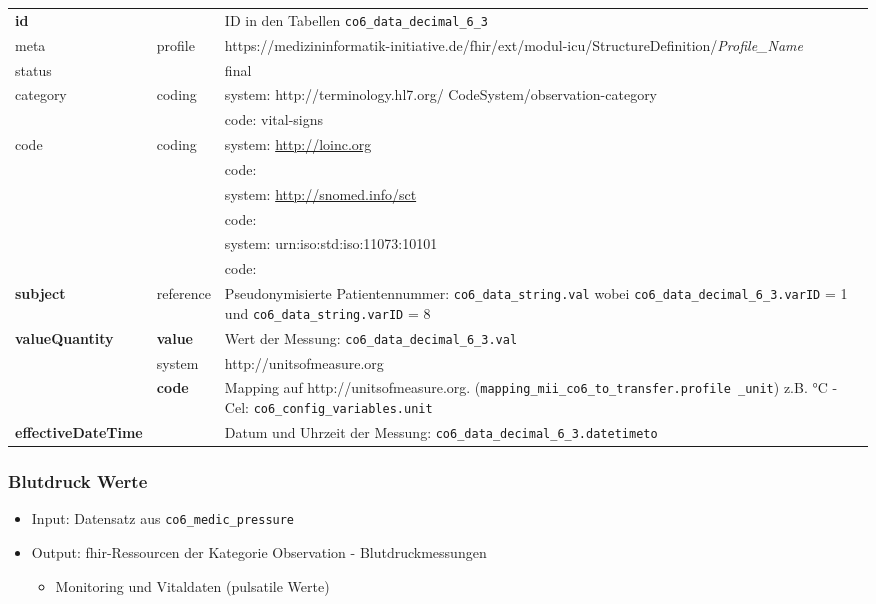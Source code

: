 \begin{longtable}{|l|l|p{7.5cm}|} 
	\hline
	\rowcolor{lightgray} \multicolumn{3}{|l|}{Data Mapping (inhaltlich) - nummerische Werte} \\ \hline
	\textbf{id} &  & ID in den Tabellen \texttt{co6\_data\_decimal\_6\_3} \\ \hline
	meta & profile & https://medizininformatik-initiative.de/fhir/ext/modul-icu/StructureDefinition/\textsl{Profile\_Name} \\ \hline 
	status &  & final  \\ \hline 
	category & coding & system: http://terminology.hl7.org/ CodeSystem/observation-category \\ 
	\cline{3-3}
	& & code: vital-signs \\ \hline
	code & coding & system: \url{http://loinc.org} \\ 
	\cline{3-3} 
	&  & code:  \\ 
	\cline{3-3} 
	&  & system: \url{http://snomed.info/sct} \\ 
	\cline{3-3}
	&  & code:  \\ 
	\cline{3-3} 
	&  & system: urn:iso:std:iso:11073:10101 \\ 
	\cline{3-3}
	&  & code:  \\ \hline
	\textbf{subject} & reference & Pseudonymisierte Patientennummer: \texttt{co6\_data\_string.val} wobei \texttt{co6\_data\_decimal\_6\_3.varID} = 1 und \texttt{co6\_data\_string.varID} = 8 \\ \hline
	\textbf{valueQuantity} & \textbf{value} & Wert der Messung: \texttt{co6\_data\_decimal\_6\_3.val} \\
	\cline{2-3}
	 & system & http://unitsofmeasure.org \\ 
	 \cline{2-3}
	 & \textbf{code} & Mapping auf http://unitsofmeasure.org. (\texttt{mapping\_mii\_co6\_to\_transfer.profile \_unit}) z.B. °C - Cel: \texttt{co6\_config\_variables.unit} \\ \hline
    \textbf{effectiveDateTime} & & Datum und Uhrzeit der Messung: \texttt{co6\_data\_decimal\_6\_3.datetimeto} \\ \hline
\end{longtable}

\subsubsection{Blutdruck Werte} \label{subsub:bloodpressure}

\begin{itemize}
\item Input: Datensatz aus \texttt{co6\_medic\_pressure} 
\item Output: \ac{fhir}-Ressourcen der Kategorie \glqq Observation\grqq{} - Blutdruckmessungen
\begin{itemize}
	\item Monitoring und Vitaldaten (pulsatile Werte)
\end{itemize}
\end{itemize}

